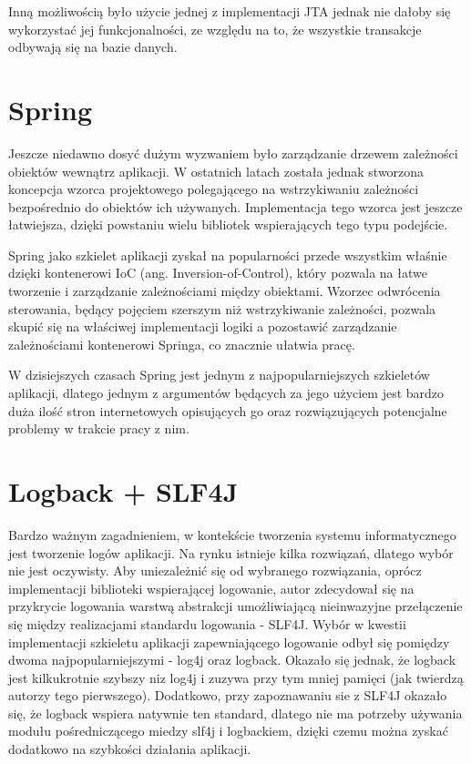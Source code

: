 Inną możliwością było użycie jednej z implementacji JTA jednak nie dałoby się wykorzystać jej funkcjonalności, ze względu na to, że wszystkie transakcje odbywają się na bazie danych.

\section{Spring}
Jeszcze niedawno dosyć dużym wyzwaniem było zarządzanie drzewem zależności obiektów wewnątrz aplikacji. W ostatnich latach została jednak stworzona koncepcja wzorca projektowego polegającego na wstrzykiwaniu zależności bezpośrednio do obiektów ich używanych. Implementacja tego wzorca jest jeszcze łatwiejsza, dzięki powstaniu wielu bibliotek wspierających tego typu podejście.

Spring jako szkielet aplikacji zyskał na popularności przede wszystkim właśnie dzięki kontenerowi IoC (ang. Inversion-of-Control), który pozwala na łatwe tworzenie i zarządzanie zależnościami między obiektami. Wzorzec odwrócenia sterowania, będący pojęciem szerszym niż wstrzykiwanie zależności, pozwala skupić się na właściwej implementacji logiki a pozostawić zarządzanie zależnościami kontenerowi Springa, co znacznie ułatwia pracę.

W dzisiejszych czasach Spring jest jednym z najpopularniejszych szkieletów aplikacji, dlatego jednym z argumentów będących za jego użyciem jest bardzo duża ilość stron internetowych opisujących go oraz rozwiązujących potencjalne problemy w trakcie pracy z nim. 

\section{Logback + SLF4J}
Bardzo ważnym zagadnieniem, w kontekście tworzenia systemu informatycznego jest tworzenie logów aplikacji. Na rynku istnieje kilka rozwiązań, dlatego wybór nie jest oczywisty. Aby uniezależnić się od wybranego rozwiązania, oprócz implementacji biblioteki wspierającej logowanie, autor zdecydował się na przykrycie logowania warstwą abstrakcji umożliwiającą nieinwazyjne przełączenie się między realizacjami standardu logowania - SLF4J. 
\newpage
Wybór w kwestii implementacji szkieletu aplikacji zapewniającego logowanie odbył się pomiędzy dwoma najpopularniejszymi - log4j oraz logback. Okazało się jednak, że logback jest kilkukrotnie szybszy niz log4j i zuzywa przy tym mniej pamięci (jak twierdzą autorzy tego pierwszego). Dodatkowo, przy zapoznawaniu sie z SLF4J okazało się, że logback wspiera natywnie ten standard, dlatego nie ma potrzeby używania modułu pośredniczącego miedzy slf4j i logbackiem, dzięki czemu można zyskać dodatkowo na szybkości działania aplikacji.

